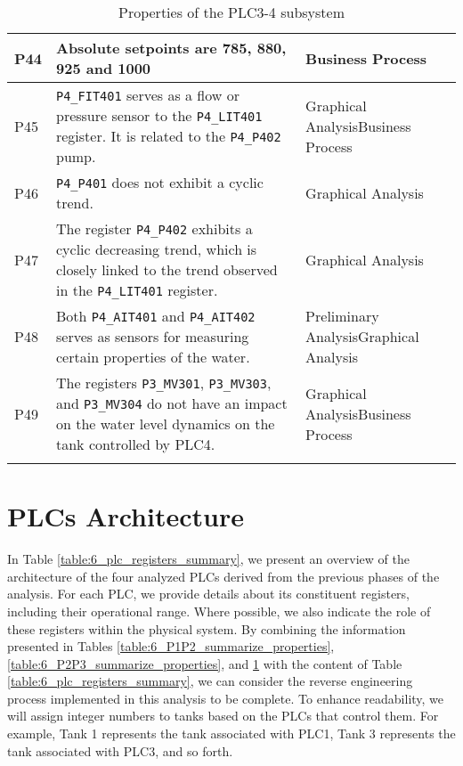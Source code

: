 {\begin{longtable}[l]{p{} p{} p{}}
		P44 & Absolute setpoints are 785, 880, 925 and 1000 & Business Process \\
		\hline
		
		P45 & \texttt{P4\_FIT401} serves as a flow or pressure sensor to the \texttt{P4\_LIT401} register. It is related to the \texttt{P4\_P402} pump. & Graphical Analysis\newline Business Process \\
		\hline
		
		P46 & \texttt{P4\_P401} does not exhibit a cyclic trend. & Graphical Analysis \\
		\hline
		
		P47 & The register \texttt{P4\_P402} exhibits a cyclic decreasing trend, which is closely linked to the trend observed in the \texttt{P4\_LIT401} register. & Graphical Analysis\\
		\hline
		
		P48 & Both \texttt{P4\_AIT401} and \texttt{P4\_AIT402} serves as sensors for measuring certain properties of the water. & Preliminary Analysis\newline Graphical Analysis \\
		\hline
		
		P49 & The registers \texttt{P3\_MV301}, \texttt{P3\_MV303}, and \texttt{P3\_MV304} do not have an impact on the water level dynamics on the tank controlled by PLC4. & Graphical Analysis\newline Business Process \\
		\hline
		
		\caption{Properties of the PLC3-4 subsystem}
		\label{table:6_P3P4_summarize_properties}
	\end{longtable}
}

\section{PLCs Architecture}
In Table \ref{table:6_plc_registers_summary}, we present an overview of the architecture of the four analyzed PLCs derived from the previous phases of the analysis. For each PLC, we provide details about its constituent registers, including their operational range. Where possible, we also indicate the role of these registers within the physical system. By combining the information presented in Tables \ref{table:6_P1P2_summarize_properties}, \ref{table:6_P2P3_summarize_properties}, and \ref{table:6_P3P4_summarize_properties} with the content of Table \ref{table:6_plc_registers_summary}, we can consider the reverse engineering process implemented in this analysis to be complete. 
To enhance readability, we will assign integer numbers to tanks based on the PLCs that control them. For example, Tank 1 represents the tank associated with PLC1, Tank 3 represents the tank associated with PLC3, and so forth.

